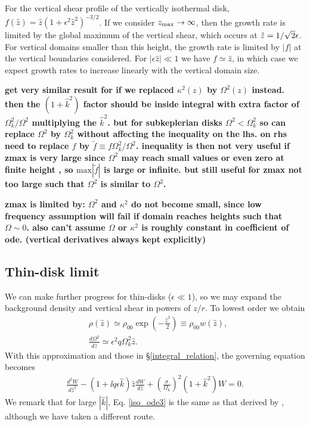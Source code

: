 For the vertical shear profile of the vertically isothermal
disk, $f(\hat{z}) =
\hat{z}\left(1+\epsilon^2\hat{z}^2\right)^{-3/2}$. If we consider
$z_\mathrm{max}\to\infty$,  then the growth rate is limited by the global
maximum of the vertical shear, which occurs at $\hat{z}
=1/\sqrt{2}\epsilon$.  
For vertical domains smaller than this height, the growth rate is
limited by $|f|$ at the vertical boundaries considered. For 
$|\epsilon\hat{z}|\ll1$ we have $f\simeq \hat{z}$, in which case we
expect growth rates to increase linearly with the vertical domain
size.  


{\bf get very similar result for if we replaced $\kappa^2(z)$ by $\Omega^2(z)$ instead. then the $(1+\hat{k}^2)$ factor should be 
inside integral with extra factor of $\Omega_k^2/\Omega^2$ multiplying the $\hat{k}^2$. but for subkeplerian disks $\Omega^2<\Omega_k^2$ so can replace
$\Omega^2$ by $\Omega^2_k$ without affecting the inequality on the lhs. on rhs need to replace $f$ by $\tilde{f}\equiv f\Omega_k^2/\Omega^2$. inequality is then not very 
useful if zmax is very large since $\Omega^2$ may reach small values or even zero at finite height , so $\mathrm{max}|\tilde{f}|$ is large or infinite. 
but still useful for zmax not too large such that $\Omega^2$ is similar to $\Omega^2$.}

{\bf zmax is limited by: $\Omega^2$ and $\kappa^2$ do not become small, since low frequency assumption will fail if domain reaches heights such that $\Omega\sim0$. also can't assume
$\Omega$ or $\kappa^2$ is roughly constant in coefficient of ode. (vertical derivatives always kept explicitly) 	
}

\subsection{Thin-disk limit}
We can make further progress for thin-disks ($\epsilon\ll1$), 
so we may expand the background density and vertical shear in powers
of $z/r$. To lowest order we obtain 
\begin{align}
  &\rho(\hat{z}) \simeq \rho_{00}
  \exp{\left(-\frac{\hat{z}^2}{2}\right)} \equiv \rho_{00}w(\hat{z}),\label{thin_dens}\\
  &\frac{d\Omega^2}{d\hat{z}} \simeq \epsilon^2q\Omega_k^2\hat{z}. \label{thin_vshear}
\end{align}
With this approximation and those in \S\ref{integral_relation}, the
governing equation becomes 
\begin{align}\label{iso_ode3}
  \frac{d^2W}{d\hat{z}^2} - \left(1 + \ii q\epsilon
    \hat{k}\right)\hat{z}\frac{dW}{d\hat{z}} +
  \left(\frac{\sigma}{\Omega_k}\right)^2\left(1+\hat{k}^2\right)W = 
  0.
\end{align}
We remark that for large $|\hat{k}|$, Eq. \ref{iso_ode3} is the same as
that derived by \cite{nelson13}, although we have taken a different
route.  

